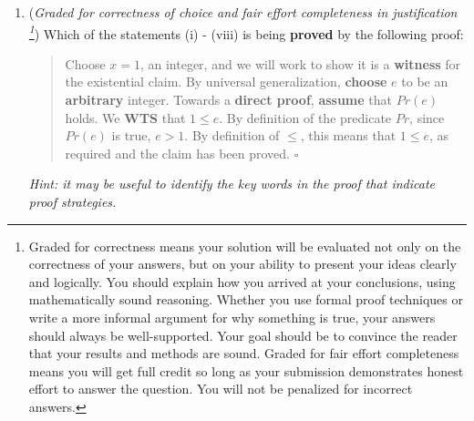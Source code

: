 \documentclass[12pt, oneside]{article}
\begin{document}
\begin{enumerate}
\begin{enumerate}
   \item ({\it Graded for correctness of choice and fair effort completeness in justification
   \footnote{Graded for correctness means your solution will be
   evaluated not only on the correctness of your answers, but on your ability to 
   present your ideas clearly and logically. You should explain how you arrived at your conclusions, using 
   mathematically sound reasoning. Whether you use formal proof techniques or write a more informal argument for why 
   something is true, your answers should always be well-supported. Your goal should be to convince the reader that 
   your results and methods are sound. Graded for fair effort completeness means 
   you will get full credit so long as your submission demonstrates honest 
   effort to answer the question. You will not be penalized for incorrect answers.}}) 
   Which of the statements (i) - (viii) is being {\bf proved} by the following proof:
   \begin{quote}
     Choose $x = 1$, an integer, and we will work to show
     it is a {\bf witness} for the existential claim. By universal generalization, {\bf choose} $e$ to be an {\bf arbitrary} integer. 
     Towards a {\bf direct proof}, {\bf assume} that $Pr(e)$ holds. We {\bf WTS} that $1 \leq e$.
     By definition of the  predicate $Pr$, since $Pr(e)$ is true, $e > 1$. By definition of $\leq$, 
     this means that $1 \leq e$, as required and the claim has been proved. $\square$
   \end{quote}
   
   
   {\it Hint: it may be useful to 
   identify the key words in the proof that indicate proof strategies.}
   

\end{enumerate}
\end{enumerate}
\end{document}
